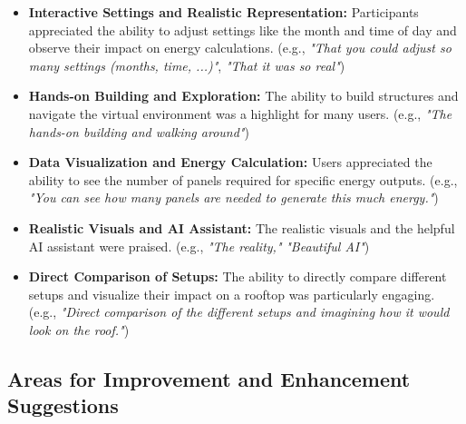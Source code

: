 \documentclass[draft, final]{vutinfth} %
\begin{document}
\begin{itemize}
    \item \textbf{Interactive Settings and Realistic Representation:} Participants appreciated the ability to adjust settings like the month and time of day and observe their impact on energy calculations. (e.g., \textit{"That you could adjust so many settings (months, time, ...)"}, \textit{"That it was so real"})
    \item \textbf{Hands-on Building and Exploration:} The ability to build structures and navigate the virtual environment was a highlight for many users. (e.g., \textit{"The hands-on building and walking around"})
    \item \textbf{Data Visualization and Energy Calculation:} Users appreciated the ability to see the number of panels required for specific energy outputs. (e.g., \textit{"You can see how many panels are needed to generate this much energy."})
    \item \textbf{Realistic Visuals and AI Assistant:} The realistic visuals and the helpful AI assistant were praised. (e.g., \textit{"The reality,"} \textit{"Beautiful AI"})
    \item \textbf{Direct Comparison of Setups:} The ability to directly compare different setups and visualize their impact on a rooftop was particularly engaging. (e.g., \textit{"Direct comparison of the different setups and imagining how it would look on the roof."})
\end{itemize}

\subsection{Areas for Improvement and Enhancement Suggestions}
\end{document}
